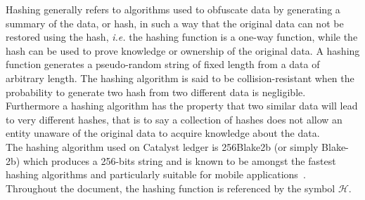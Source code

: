 Hashing generally refers to algorithms used to obfuscate data by generating a summary of the data, or hash, in such a way that the original data can not be restored using the hash, \textit{i.e.} the hashing function is a one-way function, while the hash can be used to prove knowledge or ownership of the original data. A hashing function generates a pseudo-random string of fixed length from a data of arbitrary length. The hashing algorithm is said to be collision-resistant when the probability to generate two hash from two different data is negligible. Furthermore a hashing algorithm has the property that two similar data will lead to very different hashes, that is to say a collection of hashes does not allow an entity unaware of the original data to acquire knowledge about the data. \\ 

The hashing algorithm used on Catalyst ledger is 256Blake2b (or simply Blake-2b) which produces a 256-bits string and is known to be amongst the fastest hashing algorithms and particularly suitable for mobile applications~\cite{blake}. Throughout the document, the hashing function is referenced by the symbol $\mathcal{H}$.
